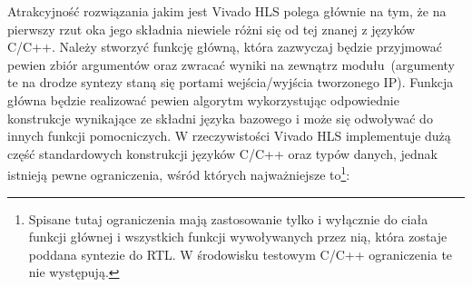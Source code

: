 Atrakcyjność rozwiązania jakim jest Vivado HLS polega głównie na tym, że na pierwszy rzut oka jego składnia niewiele różni się od tej znanej z języków C/C++. Należy stworzyć funkcję główną, która zazwyczaj będzie przyjmować pewien zbiór argumentów oraz zwracać wyniki na zewnątrz modułu~(argumenty te na drodze syntezy staną się portami wejścia/wyjścia tworzonego IP). Funkcja główna będzie realizować pewien algorytm wykorzystując odpowiednie konstrukcje wynikające ze składni języka bazowego i może się odwoływać do innych funkcji pomocniczych. W rzeczywistości Vivado HLS implementuje dużą część standardowych konstrukcji języków C/C++ oraz typów danych, jednak istnieją pewne ograniczenia, wśród których najważniejsze to\footnote{Spisane tutaj ograniczenia mają zastosowanie tylko i wyłącznie do ciała funkcji głównej i wszystkich funkcji wywoływanych przez nią, która zostaje poddana syntezie do RTL. W środowisku testowym C/C++ ograniczenia te nie występują. }:
